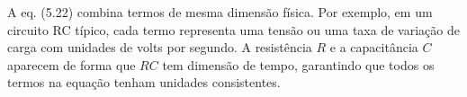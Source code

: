 A eq. (5.22) combina termos de mesma dimensão física. Por exemplo, em um circuito RC típico, cada termo representa uma tensão ou uma taxa de variação de carga com unidades de volts por segundo. A resistência $R$ e a capacitância $C$ aparecem de forma que $RC$ tem dimensão de tempo, garantindo que todos os termos na equação tenham unidades consistentes. 